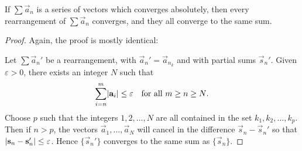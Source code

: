 \begin{thm}
  If $\sum\vec{a}_n$ is a series of vectors which converges
  absolutely, then every rearrangement of $\sum\vec{a}_n$ converges,
  and they all converge to the same sum.
\end{thm}
\begin{proof}
  Again, the proof is mostly identical:

  Let $\sum\vec{a}_n'$ be a rearrangement, with
  $\vec{a}_n' = \vec{a}_{n_k}$ and with partial sums
  $\vec{s}_n'$. Given $\varepsilon > 0$, there exists an integer $N$
  such that
  \begin{equation*}
    \sum_{i=n}^m\lvert{\mathbf{a}_i}\rvert\leq\varepsilon
    \quad\text{for all $m\geq n\geq N$}.
  \end{equation*}
  Choose $p$ such that the integers $1,2,\dots,N$ are all contained in
  the set $k_1,k_2,\dots,k_p$. Then if $n>p$, the vectors
  $\vec{a}_1,\dots,\vec{a}_N$ will cancel in the difference
  $\vec{s}_n - \vec{s}_n'$ so that
  $\lvert{\mathbf{s}_n - \mathbf{s}_n'}\rvert\leq\varepsilon$. Hence
  $\{\vec{s}_n'\}$ converges to the same sum as $\{\vec{s}_n\}$.
\end{proof}
